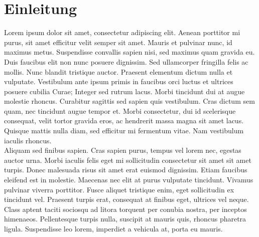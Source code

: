 
\chapter{Einleitung}

 Lorem ipsum dolor sit amet, consectetur adipiscing elit. Aenean porttitor mi purus, sit amet efficitur velit semper sit amet. Mauris et pulvinar nunc, id maximus metus. Suspendisse convallis sapien nisi, sed maximus quam gravida eu. Duis faucibus elit non nunc posuere dignissim. Sed ullamcorper fringilla felis ac mollis. Nunc blandit tristique auctor. Praesent elementum dictum nulla et vulputate. Vestibulum ante ipsum primis in faucibus orci luctus et ultrices posuere cubilia Curae; Integer sed rutrum lacus. Morbi tincidunt dui at augue molestie rhoncus. Curabitur sagittis sed sapien quis vestibulum. Cras dictum sem quam, nec tincidunt augue tempor et. Morbi consectetur, dui id scelerisque consequat, velit tortor gravida eros, ac hendrerit massa magna sit amet lacus. Quisque mattis nulla diam, sed efficitur mi fermentum vitae. Nam vestibulum iaculis rhoncus.\\[1em]
 Aliquam sed finibus sapien. Cras sapien purus, tempus vel lorem nec, egestas auctor urna. Morbi iaculis felis eget mi sollicitudin consectetur sit amet sit amet turpis. Donec malesuada risus sit amet erat euismod dignissim. Etiam faucibus eleifend est in molestie. Maecenas nec elit at purus vulputate tincidunt. Vivamus pulvinar viverra porttitor. Fusce aliquet tristique enim, eget sollicitudin ex tincidunt vel. Praesent turpis erat, consequat at finibus eget, ultrices vel neque. Class aptent taciti sociosqu ad litora torquent per conubia nostra, per inceptos himenaeos. Pellentesque turpis nulla, suscipit at mauris quis, rhoncus pharetra ligula. Suspendisse leo lorem, imperdiet a vehicula at, porta eu mauris. 

\clearpage
